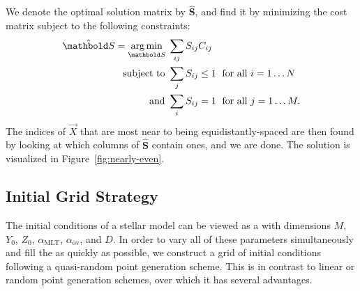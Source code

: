We denote the optimal solution matrix by $\hat{\boldsymbol{S}}$, and find it by minimizing the cost matrix subject to the following constraints:
\begin{align}
  \hat{\boldsymbol{S}} = \underset{\boldsymbol S}{\arg\min} \; & \sum_{ij} S_{ij} C_{ij} \notag\\
  \text{subject to } & \sum_j S_{ij} \leq 1 \; \text{ for all } i=1\ldots N \notag\\
  \text{and } & \sum_i S_{ij} = 1 \; \text{ for all } j=1\ldots M.
  \label{eq:optimal-spacing}
\end{align}
The indices of $\vec X$ that are most near to being equidistantly-spaced are then found by looking at which columns of $\hat{\boldsymbol S}$ contain ones, and we are done. The solution is visualized in Figure~\ref{fig:nearly-even}.



\subsection{Initial Grid Strategy}
\label{sec:grid}
The initial conditions of a stellar model can be viewed as a  with dimensions $M$, $Y_0$, $Z_0$, $\alpha_{\text{MLT}}$, $\alpha_{\text{ov}}$, and $D$. In order to vary all of these parameters simultaneously and fill the  as quickly as possible, we construct a grid of initial conditions following a quasi-random point generation scheme. This is in contrast to linear or random point generation schemes, over which it has several advantages. 

